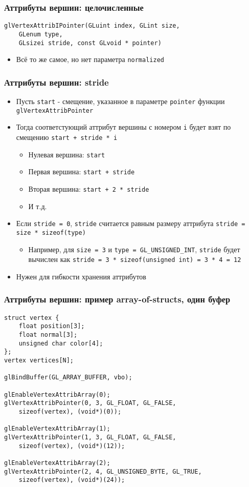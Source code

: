 \documentclass{beamer}
\begin{document}
\begin{frame}[fragile]
\frametitle{Аттрибуты вершин: целочисленные}
\begin{verbatim}
glVertexAttribIPointer(GLuint index, GLint size,
    GLenum type,
    GLsizei stride, const GLvoid * pointer)
\end{verbatim}
\begin{itemize}
\item Всё то же самое, но нет параметра \verb|normalized|
\end{itemize}
\end{frame}

\begin{frame}[fragile]
\frametitle{Аттрибуты вершин: stride}
\begin{itemize}
\item Пусть \verb|start| - смещение, указанное в параметре \verb|pointer| функции \verb|glVertexAttribPointer|
\item Тогда соответстующий аттрибут вершины с номером \verb|i| будет взят по смещению \verb|start + stride * i|
\pause
\begin{itemize}
\item Нулевая вершина: \verb|start|
\item Первая вершина: \verb|start + stride|
\item Вторая вершина: \verb|start + 2 * stride|
\item И т.д.
\end{itemize}
\pause
\item Если \verb|stride = 0|, \verb|stride| считается равным размеру аттрибута \verb|stride = size * sizeof(type)|
\begin{itemize}
\item Например, для \verb|size = 3| и \verb|type = GL_UNSIGNED_INT|, \verb|stride| будет вычислен как \verb|stride = 3 * sizeof(unsigned int) = 3 * 4 = 12|
\end{itemize}
\pause
\item Нужен для гибкости хранения аттрибутов
\end{itemize}
\end{frame}

\begin{frame}[fragile]
\frametitle{Аттрибуты вершин: пример array-of-structs, один буфер}
\fontsize{10pt}{10pt}
\begin{verbatim}
struct vertex {
    float position[3];
    float normal[3];
    unsigned char color[4];
};
vertex vertices[N];

glBindBuffer(GL_ARRAY_BUFFER, vbo);

glEnableVertexAttribArray(0);
glVertexAttribPointer(0, 3, GL_FLOAT, GL_FALSE,
    sizeof(vertex), (void*)(0));

glEnableVertexAttribArray(1);
glVertexAttribPointer(1, 3, GL_FLOAT, GL_FALSE,
    sizeof(vertex), (void*)(12));

glEnableVertexAttribArray(2);
glVertexAttribPointer(2, 4, GL_UNSIGNED_BYTE, GL_TRUE,
    sizeof(vertex), (void*)(24));
\end{verbatim}
\end{frame}
\end{document}
